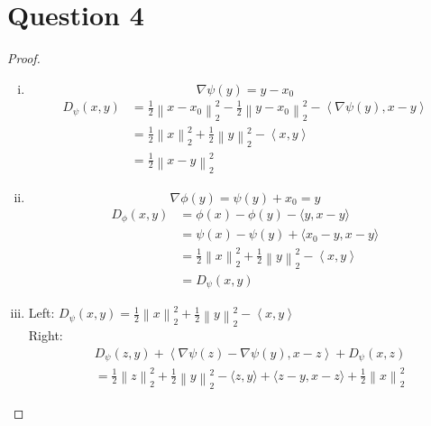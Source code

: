 \documentclass{article}
\begin{document}
\section*{Question 4}
    \begin{proof}
        \indent
        \begin{enumerate}[(i)]
            \item $$\nabla \psi(y)=y-x_0$$
            \begin{align*}
                D_{\psi}(x,y)
                &=\frac{1}{2}\left\lVert x-x_0 \right \rVert_2^2
                    -\frac{1}{2}\left\lVert y-x_0 \right \rVert_2^2
                    -\left\langle \nabla \psi(y), x-y \right\rangle\\
                &=\frac{1}{2}\left\lVert x \right \rVert_2^2
                    +\frac{1}{2}\left\lVert y \right \rVert_2^2
                    -\left\langle x,y \right\rangle\\
                &=\frac{1}{2}\left\lVert x-y \right \rVert_2^2
            \end{align*}
            \item $$\nabla \phi(y)=\psi(y)+x_0=y$$
            \begin{align*}
                D_{\phi}(x,y)
                    &=\phi(x)-\phi(y)-\langle y,x-y\rangle\\
                    &=\psi(x)-\psi(y)+\langle x_0-y,x-y \rangle\\
                    &=\frac{1}{2}\left\lVert x \right \rVert_2^2
                    +\frac{1}{2}\left\lVert y \right \rVert_2^2
                    -\left\langle x,y \right\rangle\\
                    &=D_{\psi}(x,y)
            \end{align*}
            \item Left: $D_{\psi}(x,y) = \frac{1}{2}\left\lVert x \right \rVert_2^2
            +\frac{1}{2}\left\lVert y \right \rVert_2^2
            -\left\langle x,y \right\rangle $\\
            Right: \begin{align*}
                &D_{\psi}(z,y)
                    +\left\langle \nabla\psi(z)-\nabla\psi(y), x-z \right\rangle
                    +D_{\psi}(x,z)\\
                &=\frac{1}{2}\left\lVert z \right \rVert_2^2
                    +\frac{1}{2}\left\lVert y \right \rVert_2^2
                    -\langle z,y \rangle
                    +\langle z-y,x-z \rangle
                    +\frac{1}{2}\left\lVert x \right \rVert_2^2

\end{align*}
\end{enumerate}
\end{proof}
\end{document}
